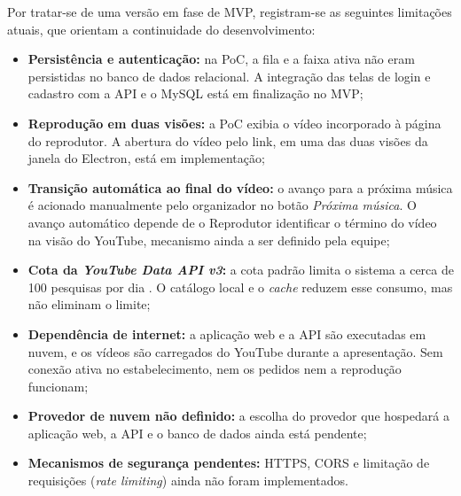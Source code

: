 Por tratar-se de uma versão em fase de MVP, registram-se as seguintes limitações atuais, que orientam a continuidade do desenvolvimento:

\begin{itemize}
  \item \textbf{Persistência e autenticação:} na PoC, a fila e a faixa ativa não eram persistidas no banco de dados relacional. A integração das telas de login e cadastro com a API e o MySQL está em finalização no MVP;
  \item \textbf{Reprodução em duas visões:} a PoC exibia o vídeo incorporado à página do reprodutor. A abertura do vídeo pelo link, em uma das duas visões da janela do Electron, está em implementação;
  \item \textbf{Transição automática ao final do vídeo:} o avanço para a próxima música é acionado manualmente pelo organizador no botão \textit{Próxima música}. O avanço automático depende de o Reprodutor identificar o término do vídeo na visão do YouTube, mecanismo ainda a ser definido pela equipe;
  \item \textbf{Cota da \textit{YouTube Data API v3}:} a cota padrão limita o sistema a cerca de 100 pesquisas por dia \cite{youtubedataapi2026}. O catálogo local e o \textit{cache} reduzem esse consumo, mas não eliminam o limite;
  \item \textbf{Dependência de internet:} a aplicação web e a API são executadas em nuvem, e os vídeos são carregados do YouTube durante a apresentação. Sem conexão ativa no estabelecimento, nem os pedidos nem a reprodução funcionam;
  \item \textbf{Provedor de nuvem não definido:} a escolha do provedor que hospedará a aplicação web, a API e o banco de dados ainda está pendente;
  \item \textbf{Mecanismos de segurança pendentes:} HTTPS, CORS e limitação de requisições (\textit{rate limiting}) ainda não foram implementados.
\end{itemize}


